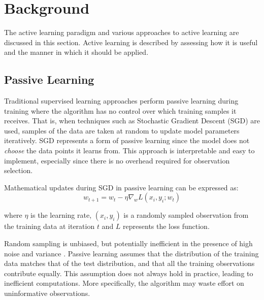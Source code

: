 \documentclass[10pt, conference]{IEEEtran}
\begin{document}
\section{Background}
The active learning paradigm and various approaches to active learning are discussed in this section. Active learning is described by assessing how it is useful and the manner in which it should be applied.

\subsection{Passive Learning}
Traditional supervised learning approaches perform passive learning during training where the algorithm has no control over which training samples it receives. That is, when techniques such as Stochastic Gradient Descent (SGD) are used, samples of the data are taken at random to update model parameters iteratively. SGD represents a form of passive learning since the model does not \textit{choose} the data points it learns from. This approach is interpretable and easy to implement, especially since there is no overhead required for observation selection.

Mathematical updates during SGD in passive learning can be expressed as:
\[
w_{t+1} = w_t - \eta \nabla_{w} L(x_i, y_i; w_t)
\]

where $\eta$ is the learning rate, $(x_i, y_i)$ is a randomly sampled observation 
from the training data at iteration $t$ and $L$ represents the loss function.



Random sampling is unbiased, but potentially inefficient in the presence of high noise and variance \cite{mahdavi}. Passive learning assumes that the distribution of the training data matches that of the test distribution, and that all the training observations contribute equally. This assumption does not always hold in practice, leading to inefficient computations. More specifically, the algorithm may waste effort on uninformative observations.
\end{document}
